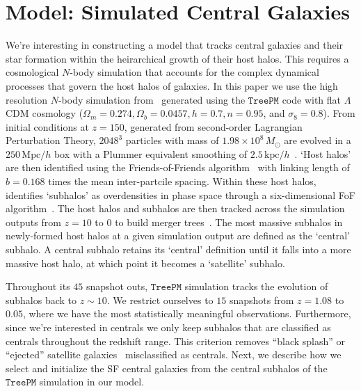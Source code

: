 \documentclass[12pt, letterpaper, preprint, tighten]{aastex62}
\begin{document}
\section{Model: Simulated Central Galaxies} \label{sec:sim}
We're interesting in constructing a model that tracks central galaxies and 
their star formation within the heirarchical growth of their host halos. This 
requires a cosmological $N$-body simulation that accounts for the complex 
dynamical processes that govern the host halos of galaxies. In this paper 
we use the high resolution $N$-body simulation from~\cite{wetzel2013} generated 
using the \cite{white2002} $\mathtt{TreePM}$ code with flat $\Lambda$CDM cosmology 
($\Omega_m =0.274, \Omega_b = 0.0457, h = 0.7, n=0.95$, and $\sigma_8 = 0.8$).
From initial conditions at $z = 150$, generated from second-order Lagrangian 
Perturbation Theory, $2048^3$ particles with mass of $1.98 \times 10^8\,M_\odot$ are 
evolved in a $250\,\mathrm{Mpc}/h$ box with a Plummer equivalent smoothing of 
$2.5\,\mathrm{kpc}/h$~\citep{wetzel2013, wetzel2014}. `Host halos' are then 
identified using the Friends-of-Friends algorithm~\citep[FoF;][]{davis1985} with 
linking length of $b{=}0.168$ times the mean inter-partcile spacing. Within 
these host halos, \cite{wetzel2013} identifies `subhalos' as overdensities 
in phase space through a six-dimensional FoF algorithm~\citep[FoF6D;][]{white2010}. 
The host halos and subhalos are then tracked across the simulation outputs 
from $z = 10$ to $0$ to build merger trees~\citep{wetzel2009,wetzel2010}. 
The most massive subhalos in newly-formed host halos at a given simulation 
output are defined as the `central' subhalo. A central subhalo retains its 
`central' definition until it falls into a more massive host halo, at which 
point it becomes a `satellite' subhalo. 

Throughout its $45$ snapshot outs, $\mathtt{TreePM}$ simulation tracks 
the evolution of subhalos back to $z \sim 10$. We restrict ourselves to $15$ 
snapshots from $z = 1.08$ to $0.05$, where we have the most statistically 
meaningful observations. Furthermore, since we're interested in centrals we only 
keep subhalos that are classified as centrals throughout the redshift 
range. This criterion removes ``black splash'' or ``ejected'' satellite 
galaxies~\citep[\emph{e.g.}][]{mamon2004,wetzel2014} misclassified as 
centrals. Next, we describe how we select and initialize the SF central
galaxies from the central subhalos of the $\mathtt{TreePM}$ 
simulation in our model.

\end{document}
